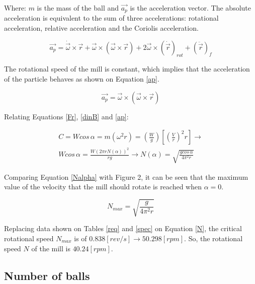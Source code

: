 Where: $m$ is the mass of the ball and $\vec{a_p}$ is the acceleration vector. The absolute acceleration is equivalent to the sum of three accelerations: rotational acceleration, relative acceleration and the Coriolis acceleration.

\begin{equation}
        \vec{a_p} = \dot{\vec{\omega}} \times \vec{r} + \vec{\omega} \times \left(\vec{\omega} \times \vec{r} \right) + 2 \vec{\omega} \times \left(\dot{\vec{r}} \right) _{rot} + \left(\ddot{\vec{r}} \right) _{f}
        \label{apG}
\end{equation}

The rotational speed of the mill is constant, which implies that the acceleration of the particle behaves as shown on Equation \ref{ap}.

\begin{equation}
        \vec{a_p} = \vec{\omega} \times \left(\vec{\omega} \times \vec{r} \right)
        \tag{6}
        \label{ap}
\end{equation}

Relating Equations \ref{Fr}, \ref{dinB} and \ref{ap}:

\begin{equation}
\begin{array}{c}
        C = W cos \, \alpha = m \left(\omega ^2 r \right) = \left(\frac{W}{g} \right) \left[ \left(\frac{V}{r} \right) ^2 r \right]  \rightarrow \\
        W cos \, \alpha = \frac{W \left(2\pi r N(\alpha) \right)^2}{rg} \rightarrow \boxed{N(\alpha) = \sqrt{\frac{g cos \, \alpha}{4 \pi ^2 r}}}
        \tag{7}
        \label{Nalpha}
\end{array}
\end{equation}

Comparing Equation \ref{Nalpha} with Figure 2, it can be seen that the maximum value of the velocity that the mill should rotate is reached when $\alpha = 0$.

\begin{equation}
        N_{max} = \sqrt{\frac{g}{4 \pi ^2 r}}
        \tag{8}
        \label{N}
\end{equation}

Replacing data shown on Tables \ref{req} and \ref{spec} on Equation \ref{N}, the critical rotational speed $N_{max}$ is of $0.838[rev/s] \rightarrow 50.298[rpm]$. So, the rotational speed $N$ of the mill is $40.24[rpm]$.

\subsection{Number of balls}

